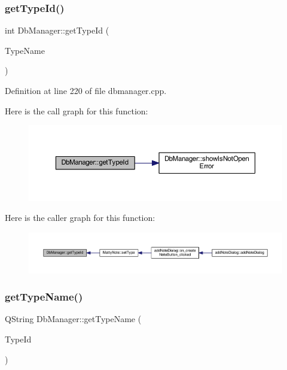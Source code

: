 \subsubsection{\texorpdfstring{get\+Type\+Id()}{getTypeId()}}
{\footnotesize\ttfamily int Db\+Manager\+::get\+Type\+Id (\begin{DoxyParamCaption}\item[{const Q\+String \&}]{Type\+Name }\end{DoxyParamCaption})\hspace{0.3cm}{\ttfamily [static]}}



Definition at line 220 of file dbmanager.\+cpp.

Here is the call graph for this function\+:
\nopagebreak
\begin{figure}[H]
\begin{center}
\leavevmode
\includegraphics[width=350pt]{classDbManager_a92ebefd0d5fae643db1fc51cc7ea0c31_cgraph}
\end{center}
\end{figure}
Here is the caller graph for this function\+:
\nopagebreak
\begin{figure}[H]
\begin{center}
\leavevmode
\includegraphics[width=350pt]{classDbManager_a92ebefd0d5fae643db1fc51cc7ea0c31_icgraph}
\end{center}
\end{figure}
\hypertarget{classDbManager_a6cb58e12049873e8b1b4b6ecd74dbfb6}{}\label{classDbManager_a6cb58e12049873e8b1b4b6ecd74dbfb6} 
\subsubsection{\texorpdfstring{get\+Type\+Name()}{getTypeName()}}
{\footnotesize\ttfamily Q\+String Db\+Manager\+::get\+Type\+Name (\begin{DoxyParamCaption}\item[{int}]{Type\+Id }\end{DoxyParamCaption})\hspace{0.3cm}{\ttfamily [static]}}



